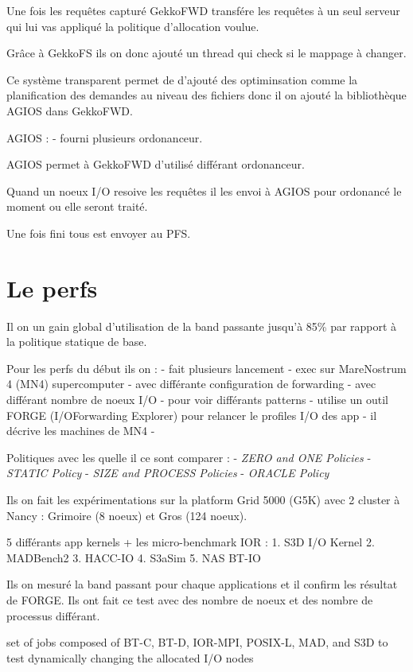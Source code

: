 \documentclass[10pt, a4paper]{article}
\begin{document}
Une fois les requêtes capturé GekkoFWD transfére les requêtes à un seul serveur qui lui vas appliqué la politique d'allocation voulue.

Grâce à GekkoFS ils on donc ajouté un thread qui check si le mappage à changer.

Ce système transparent permet de d'ajouté des optiminsation comme la planification des demandes au niveau des fichiers donc il on ajouté la bibliothèque AGIOS dans GekkoFWD.

AGIOS :
- fourni plusieurs ordonanceur.

AGIOS permet à GekkoFWD d'utilisé différant ordonanceur.

Quand un noeux I/O resoive les requêtes il les envoi à AGIOS pour ordonancé le moment ou elle seront traité.

Une fois fini tous est envoyer au PFS.

\section{Le perfs}

Il on un gain global d'utilisation de la band passante jusqu'à 85\% par rapport à la politique statique de base.

Pour les perfs du début ils on :
- fait plusieurs lancement
- exec sur MareNostrum 4 (MN4) supercomputer
- avec différante configuration de forwarding
- avec différant nombre de noeux I/O
- pour voir différants patterns
- utilise un outil FORGE (I/OForwarding Explorer) pour relancer le profiles I/O des app
- il décrive les machines de MN4
- 

Politiques avec les quelle il ce sont comparer :
- \emph{ZERO and ONE Policies}
- \emph{STATIC Policy}
- \emph{SIZE and PROCESS Policies}
- \emph{ORACLE Policy}


Ils on fait les expérimentations sur la platform Grid 5000 (G5K) avec 2 cluster à Nancy : Grimoire (8 noeux) et Gros (124 noeux). %

5 différants app kernels + les micro-benchmark IOR :
1. S3D I/O Kernel
2. MADBench2
3. HACC-IO
4. S3aSim
5. NAS BT-IO

Ils on mesuré la band passant pour chaque applications et il confirm les résultat de FORGE. Ils ont fait ce test avec des nombre de noeux et des nombre de processus différant.

set of jobs composed of BT-C, BT-D, IOR-MPI, POSIX-L, MAD, and S3D to test dynamically changing the allocated I/O nodes
\end{document}
